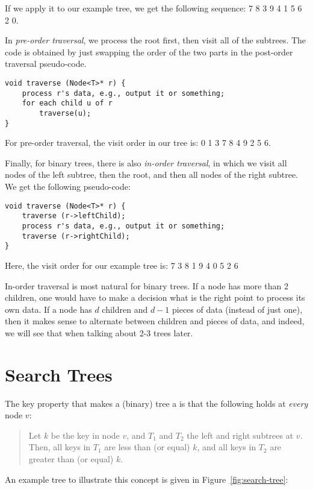 If we apply it to our example tree, we get the following sequence:
7 8 3 9 4 1 5 6 2 0.

In \emph{pre-order traversal}, we process the root first, then visit
all of the subtrees. The code is obtained by just swapping the order
of the two parts in the post-order traversal pseudo-code.

\begin{verbatim}
void traverse (Node<T>* r) {
    process r's data, e.g., output it or something;
    for each child u of r
        traverse(u);
}
\end{verbatim}

For pre-order traversal, the visit order in our tree is:
0 1 3 7 8 4 9 2 5 6.

Finally, for binary trees, there is also \emph{in-order traversal}, in
which we visit all nodes of the left subtree, then the root, and then
all nodes of the right subtree. We get the following pseudo-code:

\begin{verbatim}
void traverse (Node<T>* r) {
    traverse (r->leftChild);
    process r's data, e.g., output it or something;
    traverse (r->rightChild);
}
\end{verbatim}

Here, the visit order for our example tree is:
7 3 8 1 9 4 0 5 2 6

In-order traversal is most natural for binary trees. If a node has
more than 2 children, one would have to make a decision what is the
right point to process its own data. If a node has $d$ children and
$d-1$ pieces of data (instead of just one), then it makes sense to
alternate between children and pieces of data, and indeed, we will see
that when talking about 2-3 trees later.

\section{Search Trees}
\label{sec:trees.search-trees}
The key property that makes a (binary) tree a  is
that the following holds at \emph{every} node $v$:

\begin{quote}
Let $k$ be the key in node $v$, and $T_1$ and $T_2$ the left and right
subtrees at $v$.
Then, all keys in $T_1$ are less than (or equal) $k$, and all keys in
$T_2$ are greater than (or equal) $k$. 
\end{quote}

An example tree to illustrate this concept is given in
Figure~\ref{fig:search-tree}:

